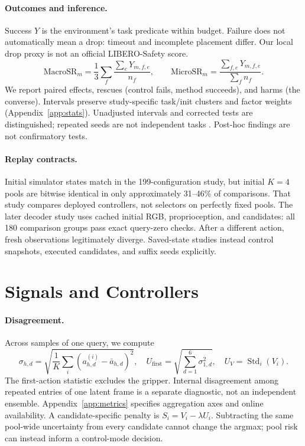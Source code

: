 \documentclass{article}
\DeclareMathOperator{\Std}{Std}
\begin{document}
\paragraph{Outcomes and inference.}
Success $Y$ is the environment's task predicate within budget. Failure
does not automatically mean a drop: timeout and incomplete placement differ.
Our local drop proxy is not an official LIBERO-Safety score.
\begin{equation}
\mathrm{MacroSR}_m=\frac13\sum_f\frac{\sum_eY_{m,f,e}}{n_f},\qquad
\mathrm{MicroSR}_m=\frac{\sum_{f,e}Y_{m,f,e}}{\sum_fn_f}.
\label{eq:sr}
\end{equation}
We report paired effects, rescues (control fails, method succeeds), and harms
(the converse). Intervals preserve study-specific task/init clusters and
factor weights (Appendix~\ref{app:stats}). Unadjusted intervals and corrected
tests are distinguished; repeated seeds are not independent tasks
\citep{rliable}. Post-hoc findings are not confirmatory tests.

\paragraph{Replay contracts.}
Initial simulator states match in the 199-configuration study, but initial
$K=4$ pools are bitwise identical in only approximately 31--46\% of comparisons.
That study compares deployed controllers, not selectors on perfectly fixed
pools. The later decoder study uses cached initial RGB, proprioception, and
candidates: all 180 comparison groups pass exact query-zero checks.
After a different action, fresh observations legitimately diverge.
Saved-state studies instead control snapshots, executed candidates, and
suffix seeds explicitly.

\section{Signals and Controllers}
\paragraph{Disagreement.}
Across samples of one query, we compute
\begin{equation}
\sigma_{h,d}=\sqrt{\frac1K\sum_i(a_{h,d}^{(i)}-\bar a_{h,d})^2},\quad
U_{\mathrm{first}}=\sqrt{\sum_{d=1}^{6}\sigma_{1,d}^2},\quad
U_V=\Std_i(V_i).
\label{eq:uncertainty}
\end{equation}
The first-action statistic excludes the gripper. Internal disagreement among
repeated entries of one latent frame is a separate diagnostic, not an
independent ensemble. Appendix~\ref{app:metrics} specifies aggregation axes
and online availability. A candidate-specific penalty is $S_i=V_i-\lambda U_i$.
Subtracting the same pool-wide uncertainty from every candidate cannot
change the argmax; pool risk can instead inform a control-mode decision.
\end{document}
